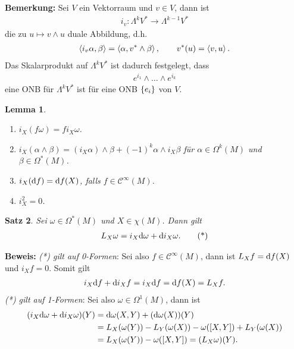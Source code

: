 \documentclass[12pt,a4paper]{article}
\newtheorem{Lemma}{Lemma}[section]
\newtheorem{Satz}[Lemma]{Satz}
\def\proof{\noindent\textbf{Beweis:}\quad}
\begin{document}
{\bf Bemerkung:}
Sei $V$ ein Vektorraum und $v\in V$, dann ist
\begin{align*}
i_v : \Lambda^kV^*\to \Lambda^{k-1}V^*
\end{align*}
die zu $u\mapsto v\wedge u$ duale Abbildung, d.h.
\begin{align*}
\left\langle i_v\alpha,\beta\right\rangle = \left\langle\alpha,v^*\wedge\beta\right\rangle,\qquad v ^*(u) = \left\langle v,u\right\rangle.
\end{align*}
Das Skalarprodukt auf $\Lambda^kV^*$ ist dadurch festgelegt, dass
\begin{align*}
e^{i_1}\wedge \ldots \wedge e^{i_k}
\end{align*}
eine ONB f\"ur $\Lambda^kV^*$ ist f\"ur eine ONB $\{e_i\}$ von $V$.

\bigskip

\begin{Lemma}
\begin{enumerate}
  \item $i_X(f\omega) = fi_X\omega$.
  \item $i_X(\alpha\wedge\beta) = (i_X\alpha)\wedge \beta + (-1)^k \alpha\wedge
  i_X\beta$ \qquad f\"ur $\alpha \in \Omega^k(M)$ und $\beta\in\Omega^*(M)$.
  \item $i_X(\mathrm{d}f) = \mathrm{d}f(X)$, falls $f\in\mathcal C^\infty(M)$.
  \item $i_X^2 = 0$.
\end{enumerate}
\end{Lemma}

\bigskip

\begin{Satz}
Sei $\omega\in\Omega^*(M)$ und $X\in\chi(M)$. Dann gilt
\begin{align*}
L_X\omega = i_X\mathrm{d}\omega + \mathrm{d} i_X\omega.\tag{*}
\end{align*}
\end{Satz}

\proof
\textit{(*) gilt auf 0-Formen}: Sei also $f\in \mathcal C^\infty(M)$, dann ist
$L_X f =\mathrm{d}f(X)$ und $i_X f = 0$. Somit gilt
\begin{align*}
i_X\mathrm{d}f + \mathrm{d} i_X f = i_X \mathrm{d}f = \mathrm{d}f(X) = L_Xf.
\end{align*}
\textit{(*) gilt auf 1-Formen}: Sei also $\omega\in\Omega^1(M)$, dann ist
\begin{align*}
(i_X\mathrm{d}\omega + \mathrm{d} i_X\omega)(Y) &= 
\mathrm{d}\omega(X,Y) + (\mathrm{d} \omega(X))(Y)\\
&= L_X(\omega(Y)) - L_Y(\omega(X)) -\omega([X,Y]) + L_Y(\omega(X))\\
&= L_X(\omega(Y)) - \omega([X,Y]) = (L_X\omega)(Y).
\end{align*}
\end{document}
